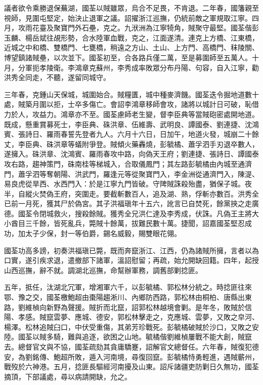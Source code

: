 \begin{pinyinscope}
議者欲令乘勝退保蕪湖，國荃以賊雖眾，烏合不足畏，不肯退。二年春，國籓親至視師，見圍屯堅定，始決止退軍之議。詔擢浙江巡撫，仍統前敵之軍規取江寧。四月，攻雨花臺及聚寶門外石壘，克之。九洑洲為江寧犄角，賊聚守最堅。國荃偕彭玉麟、楊岳斌往覘形勢，合水陸軍血戰，克之，江面遂清。連克上方橋、江東橋，近城之中和橋、雙橋門、七甕橋，稍遠之方山、土山、上方門、高橋門、秣陵關、博望鎮諸賊壘，以次並下。國荃初至，合各路兵僅二萬，至是募圍師至五萬人。十月，分軍扼孝陵衛。李鴻章克蘇州，李秀成率敗眾分布丹陽、句容，自入江寧，勸洪秀全同走，不聽，遂留同城守。

三年春，克鍾山天保城，城圍始合。賊糧匱，城中種麥濟饑。國荃迭令掘地道數十處，賊築月圍以拒，士卒多傷亡。會詔李鴻章移師會攻，諸將以城計日可破，恥借力於人，攻益力。鴻章亦不至。國荃慮師老生變，督李臣典等當賊砲密處開地道。既成，懸重賞募死士，李臣典、硃洪章、伍維壽、武明良、譚國泰、劉連捷、沈鴻賓、張詩日、羅雨春誓先登者九人。六月十六日，日加午，地道火發，城崩二十餘丈，李臣典、硃洪章等蟻附爭登。賊傾火藥轟燒，彭毓橘、蕭孚泗手刃退卒數人，遂擁入。硃洪章、沈鴻賓、羅雨春攻中路，向偽天王府；劉連捷、張詩日、譚國泰攻右路，趨神策門，硃南桂等梯城入，合取儀鳳門；其左路彭毓橘由內城至通濟門，蕭孚泗等奪朝陽、洪武門，羅逢元等從聚寶門入，李金洲從通濟門入，陳湜、易良虎從旱西、水西門入：於是江寧九門皆破。守陴賊誅殺殆盡，猶保子城。夜半，自縱火焚偽王府，突圍走。要截斬數百人，追及湖、熟，俘斬亦數百。洪秀全已前一月死，獲其尸於偽宮。其子洪福瑱年十五六，訛言已自焚死，餘黨挾之走廣德。國荃令閉城救火，搜殺餘賊。獲秀全兄洪仁達及李秀成，伏誅。凡偽王主將大小酋目三千餘，皆死亂兵，斃賊十餘萬，拔難民數十萬。捷聞，詔嘉國荃堅忍成功，加太子少保，封一等伯爵，錫名威毅，賜雙眼花翎。

國荃功高多謗，初奏洪福瑱已斃，既而奔竄浙江、江西，仍為諸賊所擁，言者以為口實，遂引疾求退，遣撤部下諸軍，溫詔慰留；再疏，始允開缺回籍。四年，起授山西巡撫，辭不就。調湖北巡撫，命幫辦軍務，調舊部剿捻匪。

五年，抵任，汰湖北冗軍，增湘軍六千，以彭毓橘、郭松林分統之。時捻匪往來鄂、豫之交，國荃檄鮑超由棗陽趨淅川、內鄉防西路，郭松林由桐柏、唐縣出東路，劉維楨向新野為聲援。賊折而北竄，詔郭松林越境會剿。是年冬，敗賊於信陽、孝感。賊竄雲夢、應城、德安，郭松林擊走之，克應城、雲夢，又敗之皁河、楊澤。松林追賊臼口，中伏受重傷，其弟芳珍戰死。彭毓橘破賊於沙口，又敗之安陸。國荃以賊多騎，難與追逐，欲困之山地。毓橘偕劉維楨屢戰不能大創，賊竄去。總督官文與不協，國荃疏劾其貪庸驕蹇，詔解官文總督任。六年春，賊復犯德安，為劉銘傳、鮑超所敗，遁入河南境，尋復回竄。彭毓橘恃勇輕進，遇賊蘄州，戰歿於六神港。五月，捻匪長驅經河南擾及山東。詔斥諸疆吏防剿日久無功，國荃摘頂，下部議處，尋以病請開缺，允之。


\end{pinyinscope}
